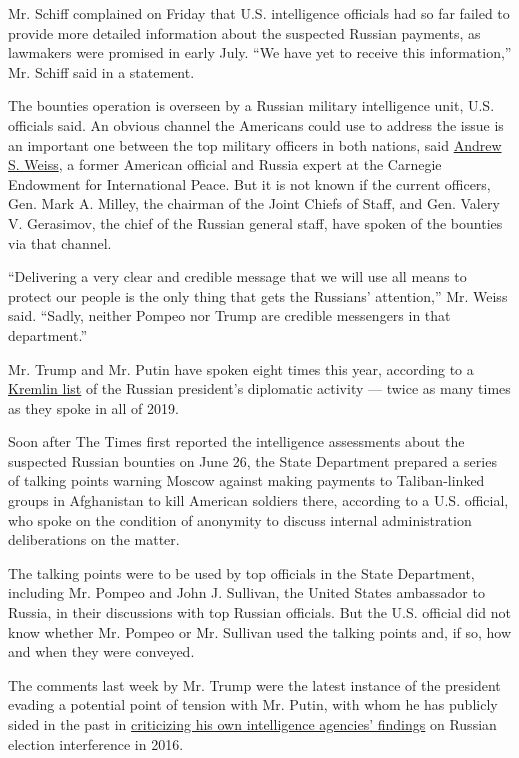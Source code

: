 Mr. Schiff complained on Friday that U.S. intelligence officials had so
far failed to provide more detailed information about the suspected
Russian payments, as lawmakers were promised in early July. ``We have
yet to receive this information,'' Mr. Schiff said in a statement.

The bounties operation is overseen by a Russian military intelligence
unit, U.S. officials said. An obvious channel the Americans could use to
address the issue is an important one between the top military officers
in both nations, said
\href{https://carnegieendowment.org/experts/824}{Andrew S. Weiss}, a
former American official and Russia expert at the Carnegie Endowment for
International Peace. But it is not known if the current officers, Gen.
Mark A. Milley, the chairman of the Joint Chiefs of Staff, and Gen.
Valery V. Gerasimov, the chief of the Russian general staff, have spoken
of the bounties via that channel.

``Delivering a very clear and credible message that we will use all
means to protect our people is the only thing that gets the Russians'
attention,'' Mr. Weiss said. ``Sadly, neither Pompeo nor Trump are
credible messengers in that department.''

Mr. Trump and Mr. Putin have spoken eight times this year, according to
a \href{http://kremlin.ru/catalog/persons/498/events/61270}{Kremlin
list} of the Russian president's diplomatic activity --- twice as many
times as they spoke in all of 2019.

Soon after The Times first reported the intelligence assessments about
the suspected Russian bounties on June 26, the State Department prepared
a series of talking points warning Moscow against making payments to
Taliban-linked groups in Afghanistan to kill American soldiers there,
according to a U.S. official, who spoke on the condition of anonymity to
discuss internal administration deliberations on the matter.

The talking points were to be used by top officials in the State
Department, including Mr. Pompeo and John J. Sullivan, the United States
ambassador to Russia, in their discussions with top Russian officials.
But the U.S. official did not know whether Mr. Pompeo or Mr. Sullivan
used the talking points and, if so, how and when they were conveyed.

The comments last week by Mr. Trump were the latest instance of the
president evading a potential point of tension with Mr. Putin, with whom
he has publicly sided in the past in
\href{https://www.nytimes3xbfgragh.onion/2018/07/16/world/europe/trump-putin-election-intelligence.html}{criticizing
his own intelligence agencies' findings} on Russian election
interference in 2016.

